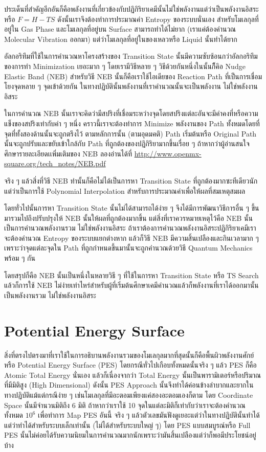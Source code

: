 ประเด็นที่สำคัญอีกอันก็คือพลังงานที่เกี่ยวข้องกับปฏิกิริยาเคมีนั้นไม่ใช่พลังงานแต่ว่าเป็นพลังงานอิสระหรือ $F = H - TS$ ดังนั้นเราจึงต้องทำการประมาณค่า Entropy ของระบบนั่นเอง สำหรับโมเลกุลที่อยู่ใน Gas Phase และโมเลกุลที่อยู่บน Surface สามารถทำได้ไม่ยาก (เราแค่ต้องคำนวณ Molecular Vibration ออกมา) แต่ว่าโมเลกุลที่อยู่ในของเหลวหรือ Liquid นั้นทำได้ยาก

อัลกอริทึมที่ใช้ในการคำนวณหาโครงสร้างของ Transition State นั้นมีความซับซ้อนกว่าอัลกอริทึมของการทำ Minimization เยอะมาก ๆ โดยเรามีวิธีหลาย ๆ วิธีด้วยกันหนึ่งในนั้นก็ึคิอ Nudge Elastic Band (NEB) สำหรับวิธี NEB นั้นก็คือเราใช้ไอเดียของ Reaction Path ที่เป็นการเชื่อมโยงจุดหลาย ๆ จุดเข้าด้วยกัน ในทางปฏิบัตินั้นพลังงานที่เราคำนวณนั้นจะเป็นพลังงาน ไม่ใช่พลังงานอิสระ

ในการคำนวณ NEB นั้นเราจะคิดว่ามีสปริงที่เชื่อมระหว่างจุดโดยสปริงแต่ละอันจะมีค่าคงที่หรือความแข็งของสปริงเท่ากับค่า ๆ หนึ่ง คราวนี้เราจะต้องทำการ Minimize พลังงานของ Path ทั้งหมดโดยที่จุดที่ทั้งสองด้านนั้นจะถูกตรึงไว้ ตามหลักการนั้น (ตามอุดมคติ) Path เริ่มต้นหรือ Original Path นั้นจะถูกปรับและขยับเข้าใกล้กับ Path ที่ถูกต้องของปฏิกิริยามากขึ้นเรื่อย ๆ ถ้าหากว่าผู้อ่านสนใจศึกษารายละเอียดเเพิ่มเติมของ NEB ลองอ่านได้ที่ \url{http://www.openmx-square.org/tech_notes/NEB.pdf}

จริง ๆ แล้วสิ่งที่วิธี NEB ทำนั้นก็คือไม่ได้เป็นการหา Transition State ที่ถูกต้องมากซะทีเดียวนักแต่ว่าเป็นการใช้ Polynomial Interpolation สำหรับการประมาณค่าเพื่อให้ผลที่สมเหตุสมผล 

โดยทั่วไปนั้นการหา Transition State นั้นไม่ได้สามารถได้ง่าย ๆ จึงได้มีการพัฒนาวิธีการอื่น ๆ ขึ้นมารวมไปถึงปรับปรุงให้ NEB นั้นให้ผลที่ถูกต้องมากขึ้น แต่สิ่งที่เราควรหมายเหตุไว้คือ NEB นั้นเป็นการคำนวณพลังงานรวม ไม่ใช่พลังงานอิสระ ถ้าเราต้องการคำนวณพลังงานอิสระปฏิกิริยาเคมีเราจะต้องคำนวณ Entropy ของระบบแยกต่างหาก แล้วก็วิธี NEB มีความสิ้นเปลืองและกินเวลามาก ๆ เพราะว่าจุดแต่ละจุดใน Path ที่ถูกกำหนดขึ้นมานั้นจะถูกคำนวณด้วยวิธี Quantum Mechanics พร้อม ๆ กัน 

โดยสรุปก็คือ NEB นั้นเป็นหนึ่งในหลายวิธี ๆ ที่ใช้ในการหา Transition State หรือ TS Search แล้วก็การใช้ NEB ไม่ง่ายเท่าไหร่สำหรับผู้ที่เริ่มต้นศึกษาเคมีคำนวณแล้วก็พลังงานที่เราได้ออกมานั้นเป็นพลังงานรวม ไม่ใช่พลังงานอิสระ 

\section{Potential Energy Surface}

สิ่งที่ตรงไปตรงมาที่เราใช้ในการอธิบานพลังงานรวมของโมเลกุลมากที่สุดนั้นก็คือพื้นผิวพลังงานศักย์หรือ Potential Energy Surface (PES) โดยกรณีทั่วไปเกือบทั้งหมดนั้นจริง ๆ แล้ว PES ก็คือ Atomic Total Energy นั่นเอง แล้วก็เนื่องจากว่า Total Energy นั้นเป็นพารามิเตอร์หรือปริมาณที่มีมิติสูง (High Dimensional) ดังนั้น PES Approach นั้นจึงทำได้ค่อนข้างลำบากและยากในทางปฏิบัติแม้แต่กรณีง่าย ๆ เช่นโมเลกุลที่มีอะตอมเพียงแค่สองอะตอมเองก็ตาม โดย Coordinate Space นั้นมีจำนวนมิติถึง 6 มิติ ถ้าหากว่าเราใช้ 10 จุดในแต่ละมิติก็เท่ากับว่าเราจะต้องคำนวณทั้งหมด $10^{6}$ เพื่อทำการ Map PES อันนี้ จริง ๆ แล้วตัวเลขมันฟังดูเยอะแต่ว่าในทางปฏิบัตินั้นทำได้แต่ว่าทำได้สำหรับระบบเล็กเท่านั้น (ไม่ได้สำหรับระบบใหญ่ ๆ) โดย PES แบบสมบูรณ์หรือ Full PES นั้นไม่ค่อยได้รับความนิยมในการคำนวณมากนักเพราะว่ามันสิ้นเปลืองแต่ว่าก็พอมีประโยชน์อยู่บ้าง


